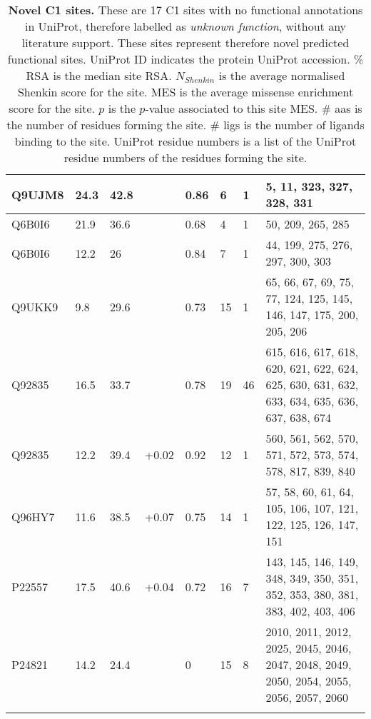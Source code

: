 \begin{landscape}
\begin{longtable}{|M{22mm}|M{15mm}|M{20mm}|M{13mm}|M{13mm}|M{10mm}|M{10mm}|M{96mm}|}
Q9UJM8     & 24.3 & 42.8     &  & 0.86 & 6           & 1          & 5, 11, 323, 327, 328, 331                                                                          \\ \hline
Q6B0I6     & 21.9 & 36.6     &  & 0.68 & 4           & 1          & 50, 209, 265, 285                                                                                  \\ \hline
Q6B0I6     & 12.2 & 26       &  & 0.84 & 7           & 1          & 44, 199, 275, 276, 297, 300, 303                                                                   \\ \hline
Q9UKK9     & 9.8  & 29.6     &  & 0.73 & 15          & 1          & 65, 66, 67, 69, 75, 77, 124, 125, 145, 146, 147, 175, 200, 205, 206                                \\ \hline
Q92835     & 16.5 & 33.7     &  & 0.78 & 19          & 46         & 615, 616, 617, 618, 620, 621, 622, 624, 625, 630, 631, 632, 633, 634, 635, 636, 637, 638, 674      \\ \hline
Q92835     & 12.2 & 39.4     & +0.02  & 0.92 & 12          & 1          & 560, 561, 562, 570, 571, 572, 573, 574, 578, 817, 839, 840                                         \\ \hline
Q96HY7     & 11.6 & 38.5     & +0.07  & 0.75 & 14          & 1          & 57, 58, 60, 61, 64, 105, 106, 107, 121, 122, 125, 126, 147, 151                                    \\ \hline
P22557     & 17.5 & 40.6     & +0.04  & 0.72 & 16          & 7          & 143, 145, 146, 149, 348, 349, 350, 351, 352, 353, 380, 381, 383, 402, 403, 406                     \\ \hline
P24821     & 14.2 & 24.4     &  & 0    & 15          & 8          & 2010, 2011, 2012, 2025, 2045, 2046, 2047, 2048, 2049, 2050, 2054, 2055, 2056, 2057, 2060           \\ \hline

\caption[Novel C1 sites]{\textbf{Novel C1 sites.} These are 17 C1 sites with no functional annotations in UniProt, therefore labelled as \textit{unknown function}, without any literature support. These sites represent therefore novel predicted functional sites. UniProt ID indicates the protein UniProt accession. \% RSA is the median site RSA. $N_{Shenkin}$ is the average normalised Shenkin score for the site. MES is the average missense enrichment score for the site. $p$ is the $p$-value associated to this site MES. \# aas is the number of residues forming the site. \# ligs is the number of ligands binding to the site. UniProt residue numbers is a list of the UniProt residue numbers of the residues forming the site.}
\label{tab:novel_c1_sites}\\
\end{longtable}
\end{landscape}
